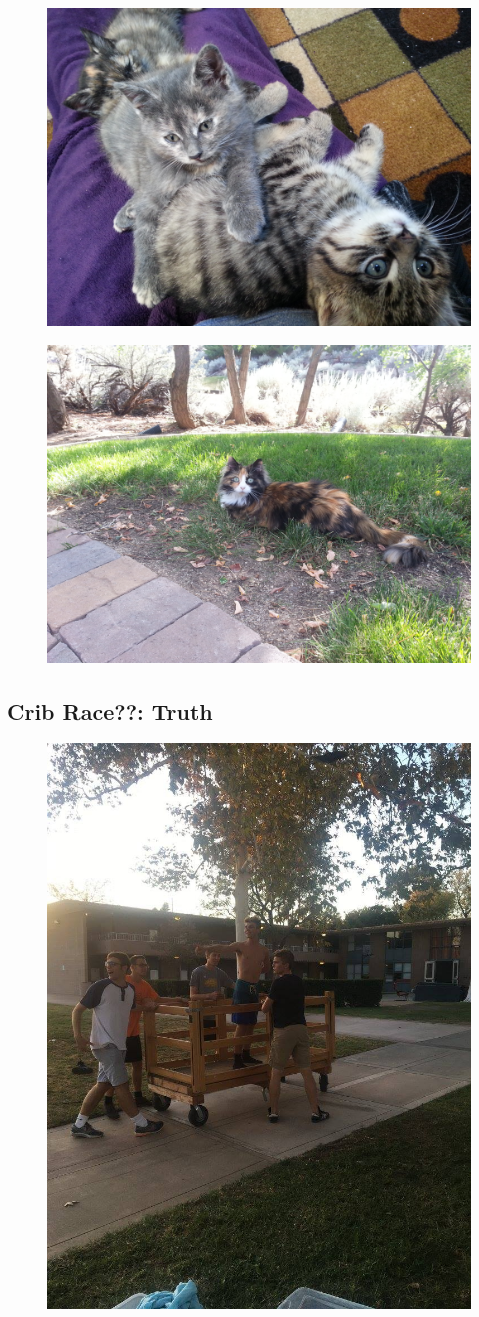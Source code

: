 \clearpage

\begin{figure}[h]
	\centering\includegraphics[width=0.6\linewidth]{images/kittens.jpg}
\end{figure}

\clearpage

\begin{figure}[h]
	\centering\includegraphics[width=0.6\linewidth]{images/cupcake.jpg}
\end{figure}

\clearpage 
\subsection*{Crib Race??:  \color{green}  Truth}

\begin{figure}[h]
	\centering\includegraphics[width=0.32\linewidth]{images/crib.jpg}
\end{figure}

